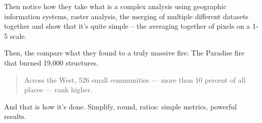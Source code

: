 \documentclass[
  letterpaper,
  DIV=11,
  numbers=noendperiod]{scrreprt}
\begin{document}
Then notice how they take what is a complex analysis using geographic
information systems, raster analysis, the merging of multiple different
datasets together and show that it's quite simple -- the averaging
together of pixels on a 1-5 scale.

Then, the compare what they found to a truly massive fire: The Paradise
fire that burned 19,000 structures.

\begin{quote}
Across the West, 526 small communities --- more than 10 percent of all
places --- rank higher.
\end{quote}

And that is how it's done. Simplify, round, ratios: simple metrics,
powerful results.
\end{document}
